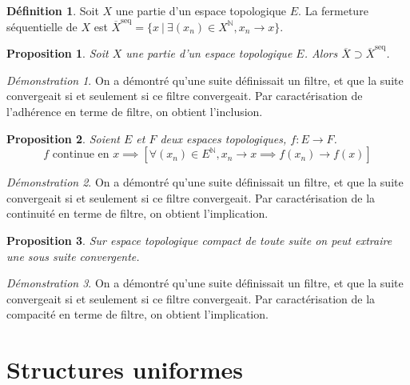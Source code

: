 \documentclass[a4paper, 11pt, french]{book}
\theoremstyle{plain} %
\newtheorem{proposition}{Proposition}
\theoremstyle{definition} %
\newtheorem{definition}{Définition}
\theoremstyle{remark} %
\newtheorem*{demonstration}{Démonstration}
\newcommand{\1}{\mathds{1}}
\newcommand{\N}{\mathbb{N}}
\newcommand{\rm}[1]{\mathrm{#1}}
\newcommand\ens[2]{\{#1 \ |\ #2\}}
\begin{document}
\begin{definition}
	Soit $X$ une partie d'un espace topologique $E$.
	La fermeture séquentielle de $X$ est $\overline{X}^\rm{seq}=\ens{x}{\exists(x_n)\in X^\N, x_n\rightarrow x}$.
\end{definition}

\begin{proposition}
	Soit $X$ une partie d'un espace topologique $E$.
	Alors $\overline{X}\supset\overline{X}^\rm{seq}$.
\end{proposition}

\begin{demonstration}
	On a démontré qu'une suite définissait un filtre, et que la suite convergeait si et seulement si ce filtre convergeait.
	Par caractérisation de l'adhérence en terme de filtre, on obtient l'inclusion.
\end{demonstration}

\begin{proposition}
	Soient $E$ et $F$ deux espaces topologiques, $f:E\rightarrow F$.
	$$
		\text{$f$ continue en $x$}
		\implies
		\left[\forall(x_n)\in E^\N, x_n\rightarrow x\implies f(x_n)\rightarrow f(x)\right]
	$$
\end{proposition}

\begin{demonstration}
	On a démontré qu'une suite définissait un filtre, et que la suite convergeait si et seulement si ce filtre convergeait.
	Par caractérisation de la continuité en terme de filtre, on obtient l'implication.
\end{demonstration}

\begin{proposition}
	Sur espace topologique compact de toute suite on peut extraire une sous suite convergente.
\end{proposition}

\begin{demonstration}
	On a démontré qu'une suite définissait un filtre, et que la suite convergeait si et seulement si ce filtre convergeait.
	Par caractérisation de la compacité en terme de filtre, on obtient l'implication.
\end{demonstration}

\chapter{Structures uniformes}
\end{document}
